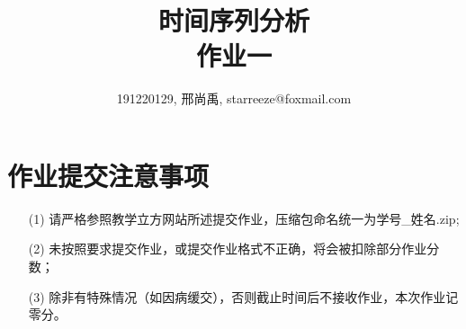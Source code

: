 \documentclass[a4paper,UTF8]{article}
\numberwithin{equation}{section}
\begin{document}
\title{时间序列分析\\
作业一}
\author{191220129, 邢尚禹, starreeze@foxmail.com}
\maketitle

\section*{作业提交注意事项}
\begin{tcolorbox}
\begin{enumerate}
  \item[(1)] 请严格参照教学立方网站所述提交作业，压缩包命名统一为{\color{red}学号\_姓名.zip};
  \item[(2)] 未按照要求提交作业，或提交作业格式不正确，将会被扣除部分作业分数；
  \item[(3)] 除非有特殊情况（如因病缓交），否则截止时间后不接收作业，本次作业记零分。
\end{enumerate}
\end{tcolorbox}
\end{document}
